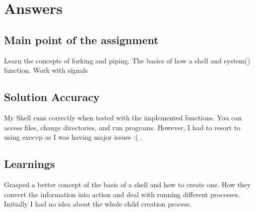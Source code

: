 \documentclass[letterpaper,10pt,titlepage]{article}
\begin{document}
\section{Answers}
\subsection{Main point of the assignment}
Learn the concepts of forking and piping. The basics of how a shell and system() function.
Work with signals 

\subsection{Solution Accuracy}
My Shell runs correctly when tested with the implemented functions. You can access files, 
change directories, and run programs. However, I had to resort to using execvp as I was having major issues
:( .


\subsection{Learnings}
Grasped a better concept of the basis of a shell and how to create one. How they convert the information 
into action and deal with running different processes. Initially I had no idea about the whole child creation process.
\end{document}
